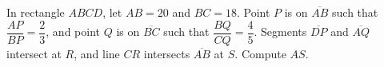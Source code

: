 In rectangle $ABCD$, let $AB=20$ and $BC=18$. Point $P$ is on $\overline{AB}$ such that $\dfrac{AP}{BP}=\dfrac{2}{3}$, and point $Q$ is on $\overline{BC}$ such that $\dfrac{BQ}{CQ}=\dfrac{4}{5}$. Segments $\overline{DP}$ and $\overline{AQ}$ intersect at $R$, and line $CR$ intersects $\overline{AB}$ at $S$. Compute $AS$.
